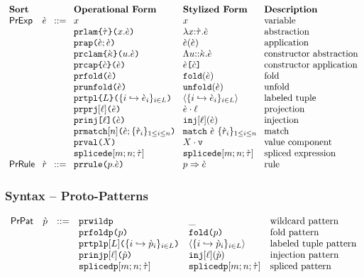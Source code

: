 \[\arraycolsep=4pt\begin{array}{lllllll}
\textbf{Sort} & & & \textbf{Operational Form} & \textbf{Stylized Form} & \textbf{Description}\\
\mathsf{PrExp} & \ce & ::= & x & x & \text{variable}\\
&&& \acelam{\ctau}{x}{\ce} & \lam{x}{\ctau}{\ce} & \text{abstraction}\\
&&& \aceap{\ce}{\ce} & \ap{\ce}{\ce} & \text{application}\\
&&& \aceclam{\cekappa}{u}{\ce} & \clam{u}{\cekappa}{\ce} & \text{constructor abstraction}\\
&&& \acecap{\ce}{\cec} & \cAp{\ce}{\cec} & \text{constructor application}\\
&&& \acefold{\ce} & \fold{\ce} & \text{fold}\\
&&& \aceunfold{\ce} & \unfold{\ce} & \text{unfold}\\
&&& \acetpl{\labelset}{\mapschema{\ce}{i}{\labelset}} & \tpl{\mapschema{\ce}{i}{\labelset}} & \text{labeled tuple}\\
&&& \acepr{\ell}{\ce} & \prj{\ce}{\ell} & \text{projection}\\
&&& \aceanain{\ell}{\ce} & \inj{\ell}{\ce} & \text{injection}\\
&&& \acematchwith{n}{\ce}{\seqschemaX{\crv}} & \matchwith{\ce}{\seqschemaX{\crv}} & \text{match}\\
&&& \acemval{X} & \mval{X} & \text{value component}\\
&&& \acesplicede{m}{n}{\ctau} & \splicede{m}{n}{\ctau} & \text{spliced expression}\\%
\mathsf{PrRule} & \crv & ::= & \acematchrule{p}{\ce} & \matchrule{p}{\ce} & \text{rule}\end{array}\]

\subsubsection{Syntax -- Proto-Patterns}
\[\begin{array}{lllllll}
\mathsf{PrPat} & \cpv & ::= & \acewildp & \wildp & \text{wildcard pattern}\\
&&& \acefoldp{p} & \foldp{p} & \text{fold pattern}\\
&&& \acetplp{\labelset}{\mapschema{\cpv}{i}{\labelset}} & \tplp{\mapschema{\cpv}{i}{\labelset}} & \text{labeled tuple pattern}\\
&&& \aceinjp{\ell}{\cpv} & \injp{\ell}{\cpv} & \text{injection pattern}\\
&&& \acesplicedp{m}{n}{\ctau} & \splicedp{m}{n}{\ctau} & \text{spliced pattern} %
\end{array}\]

